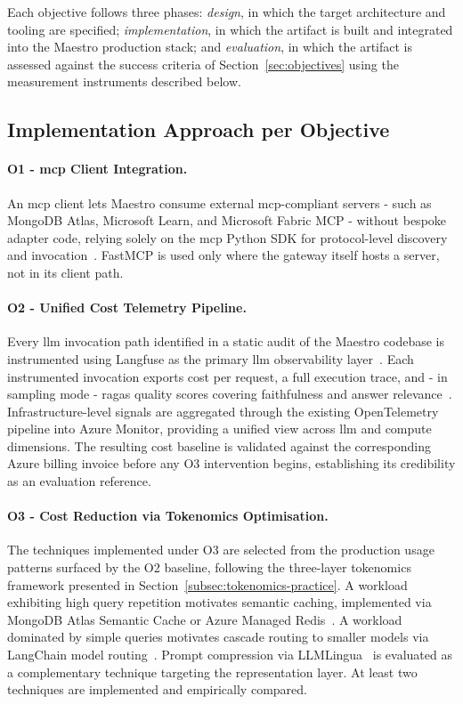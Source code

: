 Each objective follows three phases: \textit{design}, in which the target
architecture and tooling are specified; \textit{implementation}, in which the
artifact is built and integrated into the Maestro production stack; and
\textit{evaluation}, in which the artifact is assessed against the success
criteria of Section~\ref{sec:objectives} using the measurement instruments
described below.

\subsection{Implementation Approach per Objective}
\label{subsec:implementation}

\paragraph{O1 - \gls{mcp} Client Integration.}
An \gls{mcp} client lets Maestro consume external
\gls{mcp}-compliant servers - such as MongoDB Atlas, Microsoft Learn, and Microsoft
Fabric MCP - without bespoke adapter code, relying solely on the \gls{mcp} Python
SDK for protocol-level discovery and invocation~\cite{anthropic2024mcp}.
FastMCP is used only where the gateway itself hosts a server, not in its
client path.

\paragraph{O2 - Unified Cost Telemetry Pipeline.}
Every \gls{llm} invocation path identified in a static audit of the Maestro codebase
is instrumented using Langfuse as the primary \gls{llm} observability
layer~\cite{langfuse2024}.
Each instrumented invocation exports cost per request, a full execution trace,
and - in sampling mode - \gls{ragas} quality scores covering faithfulness and answer
relevance~\cite{es2023ragas}.
Infrastructure-level signals are aggregated through the existing OpenTelemetry
pipeline into Azure Monitor, providing a unified view across \gls{llm} and compute
dimensions.
The resulting cost baseline is validated against the corresponding Azure
billing invoice before any O3 intervention begins, establishing its credibility
as an evaluation reference.

\paragraph{O3 - Cost Reduction via Tokenomics Optimisation.}
The techniques implemented under O3 are selected from the production usage
patterns surfaced by the O2 baseline, following the three-layer tokenomics
framework presented in Section~\ref{subsec:tokenomics-practice}.
A workload exhibiting high query repetition motivates semantic caching,
implemented via MongoDB Atlas Semantic Cache or Azure Managed
Redis~\cite{bang2023gptcache}.
A workload dominated by simple queries motivates cascade routing to smaller
models via LangChain model routing~\cite{chen2023frugalgpt}.
Prompt compression via LLMLingua~\cite{jiang2023llmlingua} is evaluated as a
complementary technique targeting the representation layer.
At least two techniques are implemented and empirically compared.

